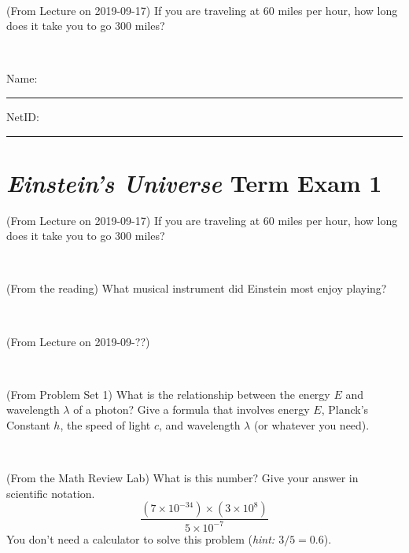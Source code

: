 \documentclass[12pt, letterpaper]{article}
\begin{document}
\vfill ~

\begin{problem} (From Lecture on 2019-09-17)
If you are traveling at 60 miles per hour, how long does
it take you to go 300 miles?
\end{problem}


\vfill ~


\cleardoublepage



\noindent
Name: \rule[-1ex]{0.60\textwidth}{0.1pt}
NetID: \rule[-1ex]{0.20\textwidth}{0.1pt}

\section*{\textsl{Einstein's Universe} Term Exam 1}
\setcounter{problem}{1}


\begin{problem} (From Lecture on 2019-09-17)
If you are traveling at 60 miles per hour, how long does
it take you to go 300 miles?
\end{problem}


\vfill ~

\begin{problem} (From the reading)
What musical instrument did Einstein most enjoy playing?
\end{problem}


\vfill ~

\begin{problem} (From Lecture on 2019-09-??)
\end{problem}


\vfill ~

\begin{problem} (From Problem Set 1)
What is the relationship between the energy $E$ and wavelength
$\lambda$ of a photon? Give a formula that involves energy $E$,
Planck's Constant $h$, the speed of light $c$, and wavelength
$\lambda$ (or whatever you need).
\end{problem}

\vfill ~


\clearpage


\begin{problem} (From the Math Review Lab)
What is this number? Give your answer in scientific notation.
$$
\frac{(7\times10^{-34})\times(3\times10^8)}{5\times10^{-7}}
$$
You don't need a calculator to solve this problem (\textit{hint: $3/5=0.6$}).
\end{problem}


\vfill ~
\end{document}
